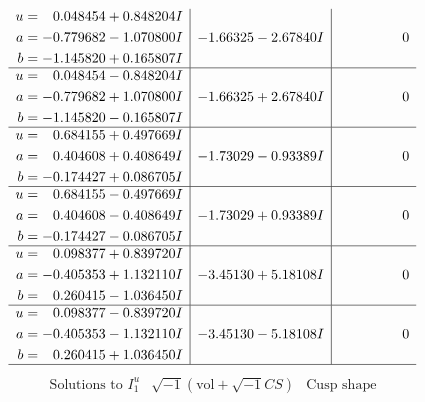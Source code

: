 \documentclass[1p]{elsarticle_modified}
\theoremstyle{definition}
\newcommand{\I}{\sqrt{-1}}
\begin{document}
$$\begin{array}{c|c|c}
\begin{aligned}
u &= \phantom{-}0.048454 + 0.848204 I \\
a &= -0.779682 - 1.070800 I \\
b &= -1.145820 + 0.165807 I\end{aligned}
 & -1.66325 - 2.67840 I & \phantom{-0.000000 } 0 \\ \hline\begin{aligned}
u &= \phantom{-}0.048454 - 0.848204 I \\
a &= -0.779682 + 1.070800 I \\
b &= -1.145820 - 0.165807 I\end{aligned}
 & -1.66325 + 2.67840 I & \phantom{-0.000000 } 0 \\ \hline\begin{aligned}
u &= \phantom{-}0.684155 + 0.497669 I \\
a &= \phantom{-}0.404608 + 0.408649 I \\
b &= -0.174427 + 0.086705 I\end{aligned}
 & -1.73029 - 0.93389 I & \phantom{-0.000000 } 0 \\ \hline\begin{aligned}
u &= \phantom{-}0.684155 - 0.497669 I \\
a &= \phantom{-}0.404608 - 0.408649 I \\
b &= -0.174427 - 0.086705 I\end{aligned}
 & -1.73029 + 0.93389 I & \phantom{-0.000000 } 0 \\ \hline\begin{aligned}
u &= \phantom{-}0.098377 + 0.839720 I \\
a &= -0.405353 + 1.132110 I \\
b &= \phantom{-}0.260415 - 1.036450 I\end{aligned}
 & -3.45130 + 5.18108 I & \phantom{-0.000000 } 0 \\ \hline\begin{aligned}
u &= \phantom{-}0.098377 - 0.839720 I \\
a &= -0.405353 - 1.132110 I \\
b &= \phantom{-}0.260415 + 1.036450 I\end{aligned}
 & -3.45130 - 5.18108 I & \phantom{-0.000000 } 0\\
 \hline 
 \end{array}$$\newpage$$\begin{array}{c|c|c}  
\text{Solutions to }I^u_{1}& \I (\text{vol} + \sqrt{-1}CS) & \text{Cusp shape}\\
 \hline 
\begin{aligned}

\end{aligned}
\end{array}$$
\end{document}
